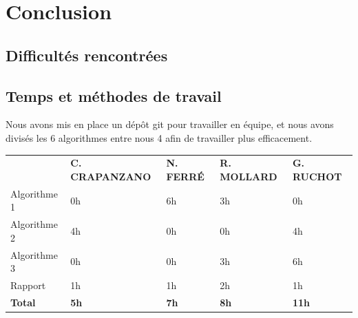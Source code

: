 \documentclass{scrreprt}
\begin{document}
\chapter{Conclusion}


\section{Difficultés rencontrées}

\section{Temps et méthodes de travail}
Nous avons mis en place un dépôt git pour travailler en équipe, et nous avons divisés les 6 algorithmes entre nous 4 afin de travailler plus efficacement.

\begin{tabular}{lllll}
                                          & \textbf{C. CRAPANZANO} & \textbf{N. FERRÉ} & \textbf{R. MOLLARD} & \textbf{G. RUCHOT} \\
Algorithme 1                              & 0h                         & 6h                     & 3h                       & 0h            \\
Algorithme 2                              & 4h                         & 0h                     & 0h                       & 4h            \\
Algorithme 3                              & 0h                         & 0h                     & 3h                       & 6h            \\
Rapport                                   & 1h                         & 1h                     & 2h                       & 1h            \\
\textbf{Total}                            & \textbf{5h}               & \textbf{7h}           & \textbf{8h}             & \textbf{11h}
\end{tabular}
\end{document}
